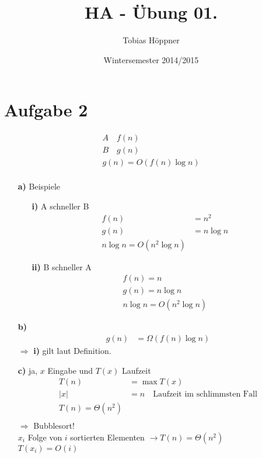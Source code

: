\documentclass[ngerman,a4paper]{report}
\author{Tobias Höppner}
\title{HA - Übung 01. }
\date{Wintersemester 2014/2015}
\renewcommand{\maketitle}{}
\begin{document}
 
\maketitle 
\section*{Aufgabe 2}
\begin{align*}
A \quad	f(n)\\
B \quad 	g(n)\\
g(n) = O (f(n)\log n)\\
\end{align*}
\begin{enumerate}
\item[\textbf{a)}] Beispiele \\
	\begin{enumerate}
	\item[\textbf{i)}] A schneller B
		\begin{align*}
		f(n) &= n^2\\
		g(n) &= n \log n\\
		n \log n = O (n^2 \log n)
		\end{align*}
	\item[\textbf{ii)}] B schneller A
		\begin{align*}
		f(n) = n\\
		g(n) = n \log n\\
		n \log n = O(n^2 \log n)
		\end{align*}
	\end{enumerate}
\item[\textbf{b)}]
	\begin{align*}
	g(n) &= \Omega (f(n) \log n)
	\end{align*}
	$\Rightarrow$ \textbf{i)} gilt laut Definition.\\
\item[\textbf{c)}] ja, $x$ Eingabe und $T(x)$ Laufzeit\\
	\begin{align*}
	T(n) &= \max T(x)\\
	|x| &= n \quad \text{Laufzeit im schlimmsten Fall}\\
	T(n) = \Theta(n^2)\\
	\end{align*}
	$\Rightarrow$ Bubblesort!\\
	$x_i$ Folge von $i$ sortierten Elementen $\rightarrow T(n) = \Theta (n^2)$\\
	$T(x_i) = O(i)$\\
	\begin{align*}

\end{align*}
\end{enumerate}
\end{document}
